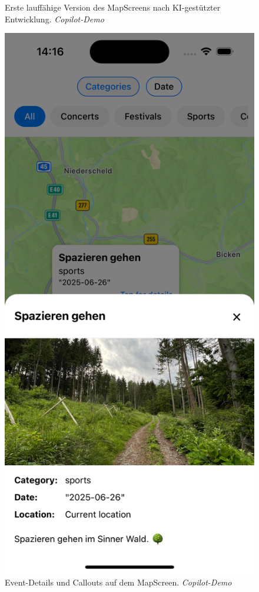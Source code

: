 \begin{figure}[htbp]
\begin{minipage}{0.48\textwidth}
            \caption{Erste lauffähige Version des MapScreens nach KI-gestützter Entwicklung. \textit{Copilot-Demo}}
      \end{minipage}
      \hfill
      \begin{minipage}{0.48\textwidth}
            \centering
            \includegraphics[width=\textwidth]{images/copilot_screenshots/Callouts+modal-copilot.png}
            \caption{Event-Details und Callouts auf dem MapScreen. \textit{Copilot-Demo}}
            \label{fig:copilot-callouts}
      \end{minipage}
\end{figure}


